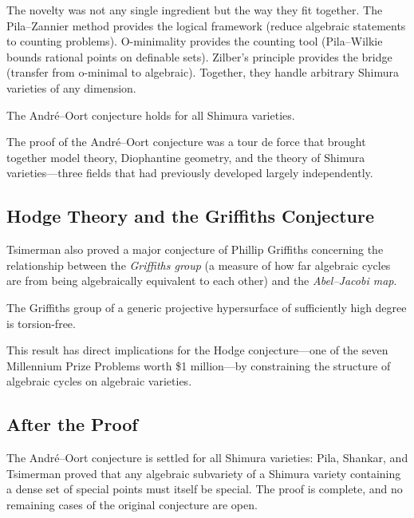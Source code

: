 The novelty was not any single ingredient but the way they fit together. The Pila--Zannier method provides the logical framework (reduce algebraic statements to counting problems). O-minimality provides the counting tool (Pila--Wilkie bounds rational points on definable sets). Zilber's principle provides the bridge (transfer from o-minimal to algebraic). Together, they handle arbitrary Shimura varieties of any dimension.

\begin{theorem}
The Andr\'{e}--Oort conjecture holds for all Shimura varieties.
\end{theorem}

\begin{highlightbox}
The proof of the Andr\'{e}--Oort conjecture was a tour de force that brought together model theory, Diophantine geometry, and the theory of Shimura varieties---three fields that had previously developed largely independently.
\end{highlightbox}

\subsection{Hodge Theory and the Griffiths Conjecture}

Tsimerman also proved a major conjecture of Phillip Griffiths concerning the relationship between the \emph{Griffiths group} (a measure of how far algebraic cycles are from being algebraically equivalent to each other) and the \emph{Abel--Jacobi map}.

\begin{theorem}
The Griffiths group of a generic projective hypersurface of sufficiently high degree is torsion-free.
\end{theorem}

This result has direct implications for the Hodge conjecture---one of the seven Millennium Prize Problems worth \$1 million---by constraining the structure of algebraic cycles on algebraic varieties.

\subsection{After the Proof}

The Andr\'{e}--Oort conjecture is settled for all Shimura varieties: Pila, Shankar, and Tsimerman proved that any algebraic subvariety of a Shimura variety containing a dense set of special points must itself be special. The proof is complete, and no remaining cases of the original conjecture are open.

